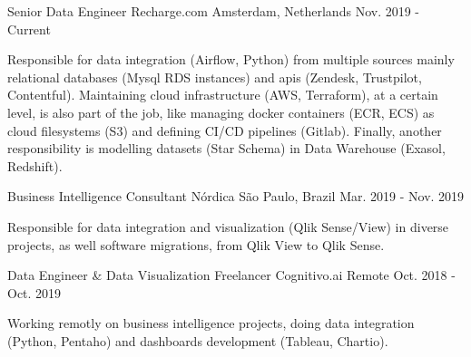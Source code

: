

\begin{cventries}

  \cventry
    {Senior Data Engineer} %
    {Recharge.com} %
    {Amsterdam, Netherlands} %
    {Nov. 2019 - Current} %
    {
      \begin{cvitems} %
        Responsible for data integration (Airflow, Python) from multiple sources mainly relational databases (Mysql RDS instances) and apis (Zendesk, Trustpilot, Contentful). Maintaining cloud infrastructure (AWS, Terraform), at a certain level, is also part of the job, like managing docker containers (ECR, ECS) as cloud filesystems (S3) and defining CI/CD pipelines (Gitlab). Finally, another responsibility is modelling datasets (Star Schema) in Data Warehouse (Exasol, Redshift).
      \end{cvitems}
    }

  \cventry
    {Business Intelligence Consultant} %
    {Nórdica} %
    {São Paulo, Brazil} %
    {Mar. 2019 - Nov. 2019} %
    {
      \begin{cvitems} %
        Responsible for data integration and visualization (Qlik Sense/View) in diverse projects, as well software migrations, from Qlik View to Qlik Sense.
      \end{cvitems}
    }

  \cventry
    {Data Engineer \& Data Visualization Freelancer} %
    {Cognitivo.ai} %
    {Remote} %
    {Oct. 2018 - Oct. 2019} %
    {
      \begin{cvitems} %
        Working remotly on business intelligence projects, doing data integration (Python, Pentaho) and dashboards development (Tableau, Chartio).
      \end{cvitems}
    }


\end{cventries}
